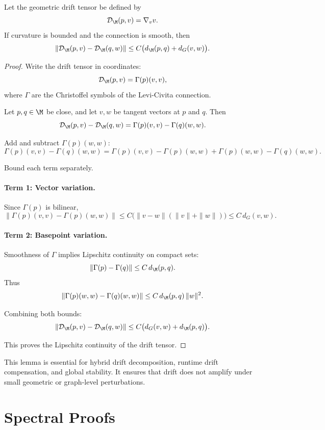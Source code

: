 \begin{lemma}
Let the geometric drift tensor be defined by
\[
\mathcal{D}_\M(p,v) = \nabla_v v.
\]
If curvature is bounded and the connection is smooth, then
\[
\|\mathcal{D}_\M(p,v) - \mathcal{D}_\M(q,w)\|
\le
C\big( d_\M(p,q) + d_G(v,w) \big).
\]
\end{lemma}

\begin{proof}
Write the drift tensor in coordinates:
\[
\mathcal{D}_\M(p,v)
= \Gamma(p)(v,v),
\]
where $\Gamma$ are the Christoffel symbols of the Levi-Civita connection.

Let $p,q \in \M$ be close, and let $v,w$ be tangent vectors at $p$ and $q$.
Then
\[
\mathcal{D}_\M(p,v) - \mathcal{D}_\M(q,w)
= \Gamma(p)(v,v) - \Gamma(q)(w,w).
\]

Add and subtract $\Gamma(p)(w,w)$:
\[
\Gamma(p)(v,v) - \Gamma(q)(w,w)
= \Gamma(p)(v,v) - \Gamma(p)(w,w)
+ \Gamma(p)(w,w) - \Gamma(q)(w,w).
\]

Bound each term separately.

\paragraph{Term 1: Vector variation.}
Since $\Gamma(p)$ is bilinear,
\[
\|\Gamma(p)(v,v) - \Gamma(p)(w,w)\|
\le
C \big( \|v-w\|(\|v\| + \|w\|) \big)
\le
C\, d_G(v,w).
\]

\paragraph{Term 2: Basepoint variation.}
Smoothness of $\Gamma$ implies Lipschitz continuity on compact sets:
\[
\|\Gamma(p) - \Gamma(q)\|
\le
C\, d_\M(p,q).
\]
Thus
\[
\|\Gamma(p)(w,w) - \Gamma(q)(w,w)\|
\le
C\, d_\M(p,q)\, \|w\|^2.
\]

Combining both bounds:
\[
\|\mathcal{D}_\M(p,v) - \mathcal{D}_\M(q,w)\|
\le
C\big( d_G(v,w) + d_\M(p,q) \big).
\]

This proves the Lipschitz continuity of the drift tensor.
\end{proof}

\begin{remark}
This lemma is essential for hybrid drift decomposition, runtime drift
compensation, and global stability. It ensures that drift does not amplify
under small geometric or graph-level perturbations.
\end{remark}

\section{Spectral Proofs}

